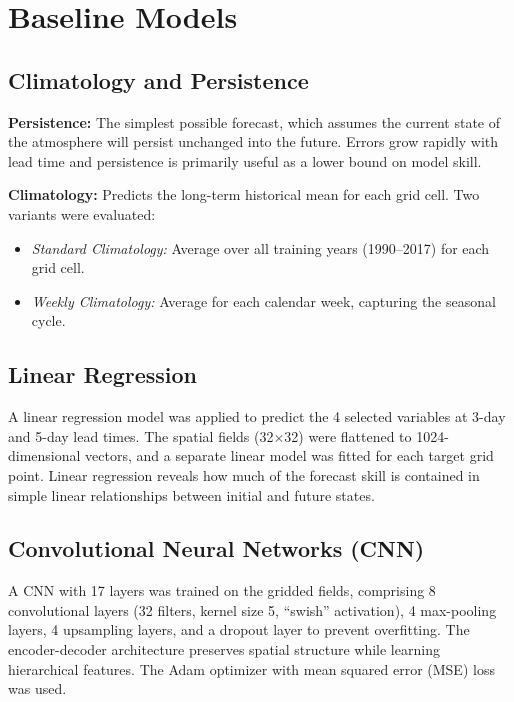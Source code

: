\documentclass[12pt,a4paper,oneside]{report}
\begin{document}
\section{Baseline Models}

\subsection{Climatology and Persistence}

\textbf{Persistence:} The simplest possible forecast, which assumes the current state of the atmosphere will persist unchanged into the future. Errors grow rapidly with lead time and persistence is primarily useful as a lower bound on model skill.

\textbf{Climatology:} Predicts the long-term historical mean for each grid cell. Two variants were evaluated:
\begin{itemize}
    \item \textit{Standard Climatology:} Average over all training years (1990--2017) for each grid cell.
    \item \textit{Weekly Climatology:} Average for each calendar week, capturing the seasonal cycle.
\end{itemize}

\subsection{Linear Regression}

A linear regression model was applied to predict the 4 selected variables at 3-day and 5-day lead times. The spatial fields (32$\times$32) were flattened to 1024-dimensional vectors, and a separate linear model was fitted for each target grid point. Linear regression reveals how much of the forecast skill is contained in simple linear relationships between initial and future states.

\subsection{Convolutional Neural Networks (CNN)}

A CNN with 17 layers was trained on the gridded fields, comprising 8 convolutional layers (32 filters, kernel size 5, ``swish'' activation), 4 max-pooling layers, 4 upsampling layers, and a dropout layer to prevent overfitting. The encoder-decoder architecture preserves spatial structure while learning hierarchical features. The Adam optimizer with mean squared error (MSE) loss was used.
\end{document}
